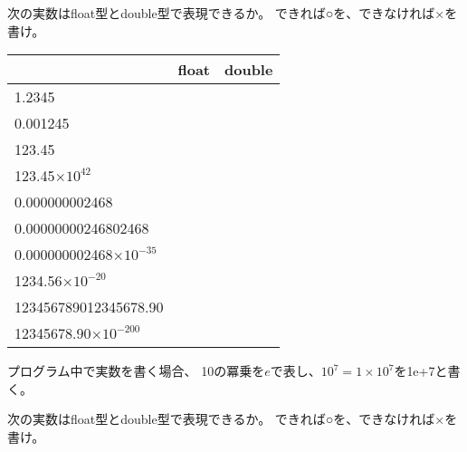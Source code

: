 \documentclass[12pt,a4j]{jarticle}
\newcounter{toi}
\def\toi{%
\bigskip\bigskip\noindent
\addtocounter{toi}{1}
\shadowbox{\bfseries\large 問\thetoi}
\nopagebreak[4]\bigskip\nopagebreak[4]
}
\begin{document}
\begin{multicols}{2}

\toi

 
 次の実数はfloat型とdouble型で表現できるか。
 できれば○を、できなければ×を書け。

 \begin{center}
 \begin{tabular}{|l|c|c|} \hline
 & float & double \\ \hline\hline
 1.2345 & & \\ \hline
 0.001245 & & \\ \hline
 123.45 & & \\ \hline
 123.45$\times10^{42}$ & & \\ \hline
 0.000000002468 & & \\ \hline
 0.00000000246802468 & & \\ \hline
 0.000000002468$\times10^{-35}$ & & \\ \hline
 1234.56$\times10^{-20}$ & & \\ \hline
 123456789012345678.90 & & \\ \hline
 12345678.90$\times10^{-200}$ & & \\ \hline
 \end{tabular}
 \end{center}







\toi


 
 プログラム中で実数を書く場合、
 10の冪乗を$e$で表し、$10^{7}=1\times 10^7$を{\ttfamily 1e+7}と書く。



 次の実数はfloat型とdouble型で表現できるか。
 できれば○を、できなければ×を書け。



\end{multicols}
\end{document}
